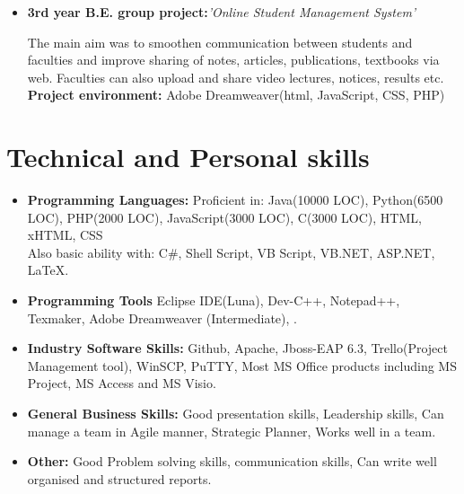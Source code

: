 \documentclass[11pt,a4paper,sans]{moderncv}        %
\begin{document}
\begin{itemize}
\vspace{8pt}

\item{\textbf{3rd year B.E. group project:}\textit{'Online Student Management System'}

\vspace{3pt}

\small{The main aim was to smoothen communication between students and faculties and improve sharing of notes, articles, publications, textbooks via web. Faculties can also upload and share video lectures, notices, results etc.}
\\ \textbf{Project environment:} Adobe Dreamweaver(html, JavaScript, CSS, PHP)
}

\end{itemize}

\section{Technical and Personal skills}

\vspace{8pt}

\begin{itemize}

\item \textbf{Programming Languages:} Proficient in: Java(10000 LOC), Python(6500 LOC), PHP(2000 LOC), JavaScript(3000 LOC), C(3000 LOC), HTML, xHTML, CSS \\ Also basic ability with: C\#, Shell Script, VB Script, VB.NET, ASP.NET, LaTeX.

\vspace{8pt}

\item \textbf{Programming Tools} Eclipse IDE(Luna), Dev-C++, Notepad++, Texmaker, Adobe Dreamweaver (Intermediate), .

\vspace{8pt}

\item \textbf{Industry Software Skills:} Github, Apache, Jboss-EAP 6.3, Trello(Project Management tool), WinSCP, PuTTY, Most MS Office products including MS Project, MS Access and MS Visio.

\vspace{8pt}

\item \textbf{General Business Skills:} Good presentation skills, Leadership skills, Can manage a team in Agile manner, Strategic Planner, Works well in a team.

\vspace{8pt}

\item \textbf{Other:} Good Problem solving skills, communication skills, Can write well organised and structured reports.

\end{itemize}
\end{document}
